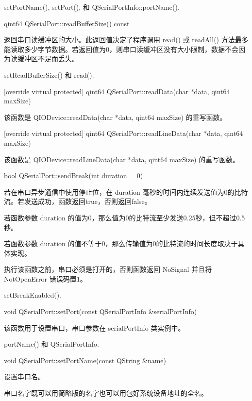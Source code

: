 \begin{seeAlso}
setPortName(), setPort(), 和 QSerialPortInfo::portName().
\end{seeAlso}

qint64 QSerialPort::readBufferSize() const

返回串口读缓冲区的大小。此返回值决定了程序调用 read() 或 readAll() 方法最多能读取多少字节数据。若返回值为0，则串口读缓冲区没有大小限制，数据不会因为读缓冲区不足而丢失。

\begin{seeAlso}
setReadBufferSize() 和 read().
\end{seeAlso}

[override virtual protected] qint64 QSerialPort::readData(char *data, qint64 maxSize)

该函数是 QIODevice::readData(char *data, qint64 maxSize) 的重写函数。

[override virtual protected] qint64 QSerialPort::readLineData(char *data, qint64 maxSize)

该函数是 QIODevice::readLineData(char *data, qint64 maxSize) 的重写函数。

bool QSerialPort::sendBreak(int duration = 0)

若在串口异步通信中使用停止位，在 duration 毫秒的时间内连续发送值为0的比特流。若发送成功，函数返回true，否则返回false。

若函数参数 duration 的值为0，那么值为0的比特流至少发送0.25秒，但不超过0.5秒。

若函数参数 duration 的值不等于0，那么传输值为0的比特流的时间长度取决于具体实现。

\begin{notice}
执行该函数之前，串口必须是打开的，否则函数返回 NoSignal 并且将 NotOpenError 错误码置1。
\end{notice}

\begin{seeAlso}
setBreakEnabled().
\end{seeAlso}

void QSerialPort::setPort(const QSerialPortInfo \&serialPortInfo)

该函数用于设置串口，串口参数在 serialPortInfo 类实例中。

\begin{seeAlso}
portName() 和 QSerialPortInfo.
\end{seeAlso}

void QSerialPort::setPortName(const QString \&name)

设置串口名。

串口名字既可以用简略版的名字也可以用包好系统设备地址的全名。

